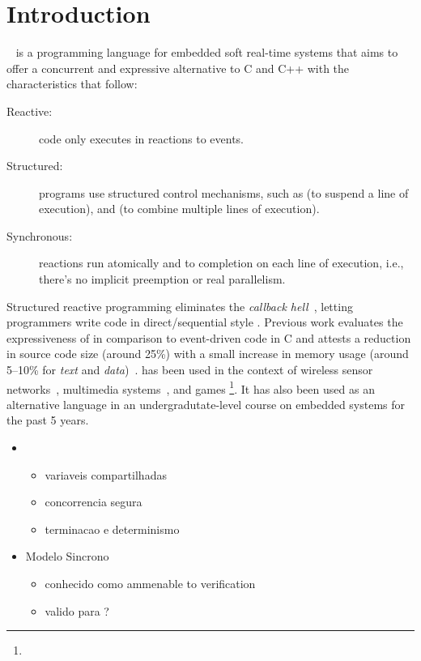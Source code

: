 \section{Introduction}
\label{sec.intro}

\CEU~\cite{ceu.sensys13} is a programming language for embedded soft real-time
systems that aims to offer a concurrent and expressive alternative to C and C++
with the characteristics that follow:

\begin{description}
\item [Reactive:] code only executes in reactions to events.
\item [Structured:] programs use structured control mechanisms, such as
     (to suspend a line of execution), and  (to combine
    multiple lines of execution).
\item [Synchronous:] reactions run atomically and to completion on each line of
    execution, i.e., there's no implicit preemption or real parallelism.
\end{description}

Structured reactive programming eliminates the
\emph{callback hell}~\cite{TODO}, letting programmers write code in
direct/sequential style \cite{TODO}.
%
Previous work evaluates the expressiveness of \CEU in comparison to
event-driven code in C and attests a reduction in source code size (around
25\%) with a small increase in memory usage (around 5--10\% for \emph{text} and 
\emph{data})~\cite{ceu.sensys13}.
%
\CEU has been used in the context of wireless sensor
networks~\cite{ceu.sensys13,ceu.terra},
multimedia systems~\cite{ceu.media.webmedia16}, and
games \footnote{}.
It has also been used as an alternative language in an undergradutate-level
course on embedded systems for the past 5 years.


\begin{itemize}
\item \CEU
    \begin{itemize}
    \item variaveis compartilhadas
    \item concorrencia segura
    \item terminacao e determinismo
    \end{itemize}
\item Modelo Sincrono
    \begin{itemize}
    \item conhecido como ammenable to verification
    \item valido para \CEU?
    \end{itemize}
\end{itemize}



